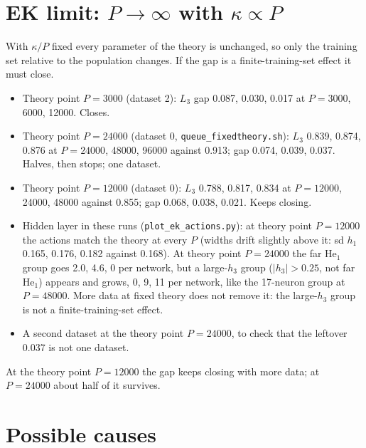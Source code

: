\documentclass[11pt,a4paper]{article}
\newcommand{\mworked}{\textcolor{worked}{\Large$\bm\checkmark$}}
\newcommand{\mfailed}{\textcolor{failed}{\Large$\bm\times$}}
\newcommand{\munclear}{\textcolor{unclear}{\Large\textbf{?}}}
\newcommand{\mtodo}{\textcolor{neutral}{\Large$\square$}}
\newcommand{\worked}{\item[\mworked]}
\newcommand{\failed}{\item[\mfailed]}
\newcommand{\unclear}{\item[\munclear]}
\newcommand{\todo}{\item[\mtodo]}
\begin{document}
\section*{EK limit: $P\to\infty$ with $\kappa\propto P$}
With $\kappa/P$ fixed every parameter of the theory is unchanged, so only the training set relative to the
population changes. If the gap is a finite-training-set effect it must close.
\begin{itemize}
\worked Theory point $P=3000$ (dataset 2): $L_3$ gap 0.087, 0.030, 0.017 at $P=3000$, 6000, 12000. Closes.
\unclear Theory point $P=24000$ (dataset 0, \texttt{queue\_fixedtheory.sh}): $L_3$ 0.839, 0.874, 0.876 at $P=24000$,
  48000, 96000 against 0.913; gap 0.074, 0.039, 0.037. Halves, then stops; one dataset.
\worked Theory point $P=12000$ (dataset 0): $L_3$ 0.788, 0.817, 0.834 at $P=12000$, 24000, 48000 against 0.855;
  gap 0.068, 0.038, 0.021. Keeps closing.
\failed Hidden layer in these runs (\texttt{plot\_ek\_actions.py}): at theory point $P=12000$ the actions match the
  theory at every $P$ (widths drift slightly above it: sd $h_1$ 0.165, 0.176, 0.182 against 0.168). At theory point
  $P=24000$ the far $\mathrm{He}_1$ group goes 2.0, 4.6, 0 per network, but a large-$h_3$ group ($|h_3|>0.25$, not far
  $\mathrm{He}_1$) appears and grows, 0, 9, 11 per network, like the 17-neuron group at $P=48000$. More data at fixed
  theory does not remove it: the large-$h_3$ group is not a finite-training-set effect.
\todo A second dataset at the theory point $P=24000$, to check that the leftover 0.037 is not one dataset.
\end{itemize}
At the theory point $P=12000$ the gap keeps closing with more data; at $P=24000$ about half of it survives.

\section*{Possible causes}
\end{document}
